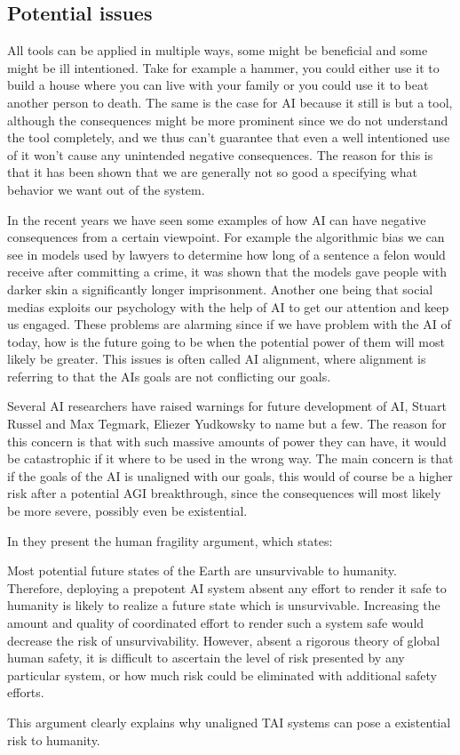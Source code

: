 \documentclass[12pt,A4]{report}
\theoremstyle{definition}
\begin{document}
\subsection{Potential issues}
All tools can be applied in multiple ways, some might be beneficial and some might be ill intentioned. Take for example a hammer, you could either use it to build a house where you can live with your family or you could use it to beat another person to death. The same is the case for AI because it still is but a tool, although the consequences might be more prominent since we do not understand the tool completely, and we thus can't guarantee that even a well intentioned use of it won't cause any unintended negative consequences. The reason for this is that it has been shown that we are generally not so good a specifying what behavior we want out of the system.

In the recent years we have seen some examples of how AI can have negative consequences from a certain viewpoint. For example the algorithmic bias we can see in models used by lawyers to determine how long of a sentence a felon would receive after committing a crime, it was shown that the models gave people with darker skin a significantly longer imprisonment. Another one being that social medias exploits our psychology with the help of AI to get our attention and keep us engaged. These problems are alarming since if we have problem with the AI of today, how is the future going to be when the potential power of them will most likely be greater. This issues is often called AI alignment, where alignment is referring to that the AIs goals are not conflicting our goals. 

Several AI researchers have raised warnings for future development of AI, Stuart Russel and Max Tegmark, Eliezer Yudkowsky to name but a few. The reason for this concern is that with such massive amounts of power they can have, it would be catastrophic if it where to be used in the wrong way. The main concern is that if the goals of the AI is unaligned with our goals, this would of course be a higher risk after a potential AGI breakthrough, since the consequences will most likely be more severe, possibly even be existential. 

In \autocite{Critch Kruger} they present the human fragility argument, which states: 
\begin{displayquote}
Most potential future states of the Earth are unsurvivable to humanity. Therefore, deploying a prepotent AI system absent any effort to render it safe to humanity is likely to realize a future state which is unsurvivable. Increasing the amount and quality of coordinated effort to render such a system safe would decrease the risk of unsurvivability. However, absent a rigorous theory of global human safety, it is difficult to ascertain the level of risk presented by any particular system, or how much risk could be eliminated with additional safety efforts.
\end{displayquote}
This argument clearly explains why unaligned TAI systems can pose a existential risk to humanity. 
\end{document}
